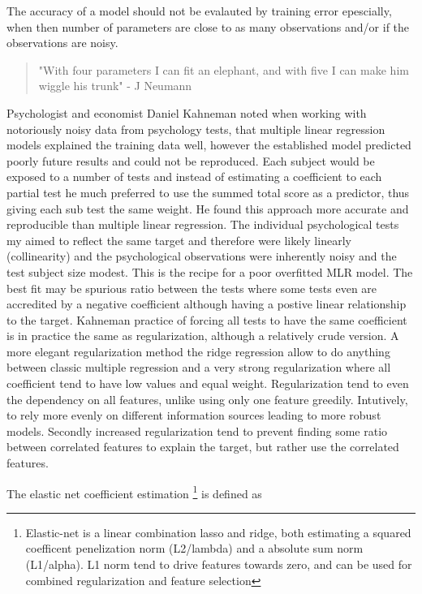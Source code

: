 The accuracy of a model should not be evalauted by training error epescially, when then number of parameters are close to as many observations and/or if the observations are noisy.

\begin{quotation}
"With four parameters I can fit an elephant, and with five I can make him wiggle his trunk"  - J Neumann
\cite{wiki2016John}
\end{quotation}

Psychologist and economist Daniel Kahneman noted when working with notoriously noisy data from psychology tests, that multiple linear regression models explained the training data well, however the established model predicted poorly future results and could not be reproduced. Each subject would be exposed to a number of tests and instead of estimating a coefficient to each partial test he much preferred to use the summed total score as a predictor, thus giving each sub test the same weight. He found this approach more accurate and reproducible than multiple linear regression\cite{kahneman2011thinking}. The individual psychological tests my aimed to reflect the same target and therefore were likely linearly (collinearity) and the psychological observations were inherently noisy and the test subject size modest. This is the recipe for a poor overfitted MLR model.
The best fit may be spurious ratio between the tests where some tests even are accredited by a negative coefficient although having a postive linear relationship to the target. Kahneman practice  of forcing all tests to have the same coefficient is in practice the same as regularization, although a relatively crude version. A more elegant regularization method the ridge regression allow to do anything between classic multiple regression and a very strong regularization where all coefficient tend to have low values and equal weight. Regularization tend to even the dependency on all features, unlike using only one feature greedily. Intutively, to rely more evenly on different information sources leading to more robust models. Secondly increased regularization tend to prevent finding some ratio between correlated features to explain the target, but rather use the correlated features.

The elastic net coefficient estimation \footnote{Elastic-net is a linear combination lasso and ridge, both estimating a squared coefficent penelization norm (L2/lambda) and a absolute sum norm (L1/alpha). L1 norm tend to drive features towards zero, and can be used for combined regularization and feature selection} is defined as 

